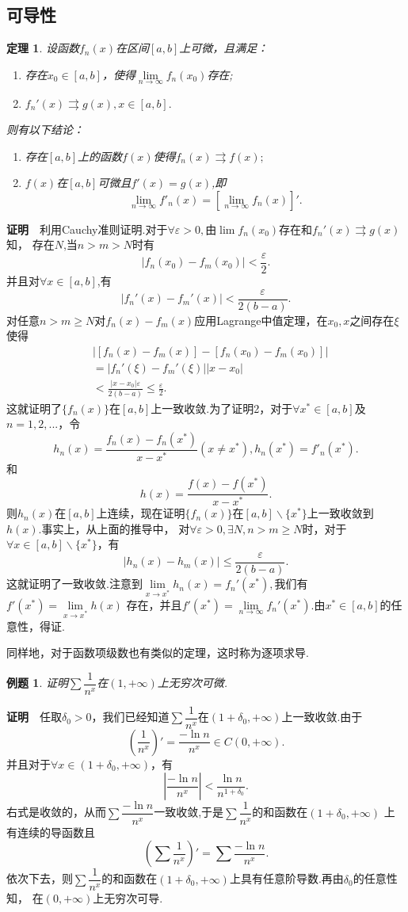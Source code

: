 \documentclass[UTF8]{article}
\newcommand{\zm}{\textbf{证明}$\quad$}
\newtheorem{thm}{\hspace{2em}定理}[section]
\newtheorem{exa}{\hspace{2em}例题}[section]
\begin{document}
\subsection{可导性}
  \begin{thm}
    设函数$f_n(x)$在区间$[a,b]$上可微，且满足：
    \begin{enumerate}
      \item 存在$x_0\in[a,b]$，使得$\lim\limits_{n\to\infty}f_n(x_0)$存在;
      \item $f_n'(x)\rightrightarrows g(x),x\in[a,b].$
    \end{enumerate}
    则有以下结论：
    \begin{enumerate}
      \item 存在$[a,b]$上的函数$f(x)$使得$f_n(x)\rightrightarrows f(x);$
      \item $f(x)$在$[a,b]$可微且$f'(x)=g(x)$,即
      $$\lim_{n\to\infty}f'_n(x)=[\lim_{n\to\infty}f_n(x)]'.$$
    \end{enumerate}
  \end{thm}
  \zm 利用Cauchy准则证明.对于$\forall\varepsilon>0,$由$\lim f_n(x_0)$存在和$f_n'(x)\rightrightarrows g(x)$知，
  存在$N$,当$n>m>N$时有
  $$|f_n(x_0)-f_m(x_0)|<\frac{\varepsilon}{2}.$$
  并且对$\forall x\in[a,b]$,有
  $$|f_n'(x)-f_m'(x)|<\frac{\varepsilon}{2(b-a)}.$$
  对任意$n>m\ge N$对$f_n(x)-f_m(x)$应用Lagrange中值定理，在$x_0,x$之间存在$\xi$使得
  \begin{align*}
    &|[f_n(x)-f_m(x)]-[f_n(x_0)-f_m(x_0)]|\\
    &=|f_n'(\xi)-f_m'(\xi)||x-x_0|\\
    &<\frac{|x-x_0|\varepsilon}{2(b-a)}\le\frac{\varepsilon}{2}.
  \end{align*}
  这就证明了$\{f_n(x)\}$在$[a,b]$上一致收敛.为了证明2，对于$\forall x^*\in[a,b]$及$n=1,2,...$，令
  $$h_n(x)=\frac{f_n(x)-f_n(x^*)}{x-x^*}(x\ne x^*),h_n(x^*)=f'_n(x^*).$$
  和
  $$h(x)=\frac{f(x)-f(x^*)}{x-x^*}.$$
  则$h_n(x)$在$[a,b]$上连续，现在证明$\{f_n(x)\}$在$[a,b]\backslash\{x^*\}$上一致收敛到$h(x).$事实上，从上面的推导中，
  对$\forall \varepsilon>0,\exists N,n>m\ge N$时，对于$\forall x\in[a,b]\backslash\{x^*\}$，有
  $$|h_n(x)-h_m(x)|\le\frac{\varepsilon}{2(b-a)}.$$
  这就证明了一致收敛.注意到$\lim\limits_{x\to x^*}h_n(x)=f_n'(x^*),$我们有$f'(x^*)=\lim\limits_{x\to x^*}h(x)$
  存在，并且$f'(x^*)=\lim\limits_{n\to\infty}f_n'(x^*).$由$x^*\in[a,b]$的任意性，得证.

  同样地，对于函数项级数也有类似的定理，这时称为逐项求导.
  \begin{exa}
    证明$\sum\dfrac{1}{n^x}$在$(1,+\infty)$上无穷次可微.
  \end{exa}
  \zm 任取$\delta_0>0$，我们已经知道$\sum\dfrac{1}{n^x}$在$(1+\delta_0,+\infty)$上一致收敛.由于
  $$\left(\frac{1}{n^x}\right)'=\frac{-\ln n}{n^x}\in C(0,+\infty).$$
  并且对于$\forall x\in(1+\delta_0,+\infty)$，有
  $$\left|\frac{-\ln n}{n^x}\right|<\frac{\ln n}{n^{1+\delta_0}}.$$
  右式是收敛的，从而$\sum\dfrac{-\ln n}{n^x}$一致收敛,于是$\sum\dfrac{1}{n^x}$的和函数在$(1+\delta_0,+\infty)$
  上有连续的导函数且
  $$\left(\sum\dfrac{1}{n^x}\right)'=\sum\frac{-\ln n}{n^x}.$$
  依次下去，则$\sum\dfrac{1}{n^x}$的和函数在$(1+\delta_0,+\infty)$上具有任意阶导数.再由$\delta_0$的任意性知，
  在$(0,+\infty)$上无穷次可导.
\end{document}
